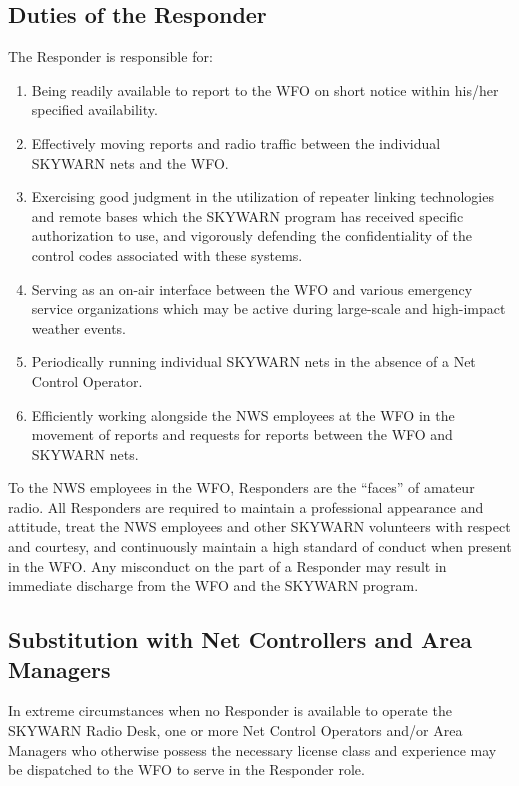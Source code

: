 \documentclass[pdflatex,letterpaper,twoside,12pt]{book}
\begin{document}
\subsection{Duties of the Responder}

The Responder is responsible for:

\begin{enumerate}
\item Being readily available to report to the WFO on short notice within his/her specified availability.
\item Effectively moving reports and radio traffic between the individual SKYWARN nets and the WFO.
\item Exercising good judgment in the utilization of repeater linking technologies and remote bases which the SKYWARN program has received specific authorization to use, and vigorously defending the confidentiality of the control codes associated with these systems.
\item Serving as an on-air interface between the WFO and various emergency service organizations which may be active during large-scale and high-impact weather events.
\item Periodically running individual SKYWARN nets in the absence of a Net Control Operator.
\item Efficiently working alongside the NWS employees at the WFO in the movement of reports and requests for reports between the WFO and SKYWARN nets.
\end{enumerate}

To the NWS employees in the WFO, Responders are the ``faces'' of amateur radio.  All Responders are required to maintain a professional appearance and attitude, treat the NWS employees and other SKYWARN volunteers with respect and courtesy, and continuously maintain a high standard of conduct when present in the WFO. Any misconduct on the part of a Responder may result in immediate discharge from the WFO and the SKYWARN program.

\subsection{Substitution with Net Controllers and Area Managers}

In extreme circumstances when no Responder is available to operate the SKYWARN Radio Desk, one or more Net Control Operators and/or Area Managers who otherwise possess the necessary license class and experience may be dispatched to the WFO to serve in the Responder role.
\end{document}
